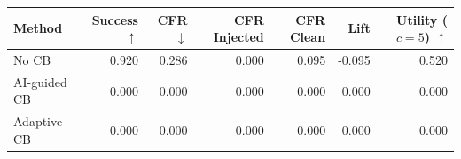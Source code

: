 \begin{tabular}{lrrrrrr}
\toprule
Method & Success $\uparrow$ & CFR $\downarrow$ & CFR Injected & CFR Clean & Lift & Utility ($c=5$) $\uparrow$ \\
\midrule
No CB & 0.920 & 0.286 & 0.000 & 0.095 & -0.095 & 0.520 \\
AI-guided CB & 0.000 & 0.000 & 0.000 & 0.000 & 0.000 & 0.000 \\
Adaptive CB & 0.000 & 0.000 & 0.000 & 0.000 & 0.000 & 0.000 \\
\bottomrule
\end{tabular}
